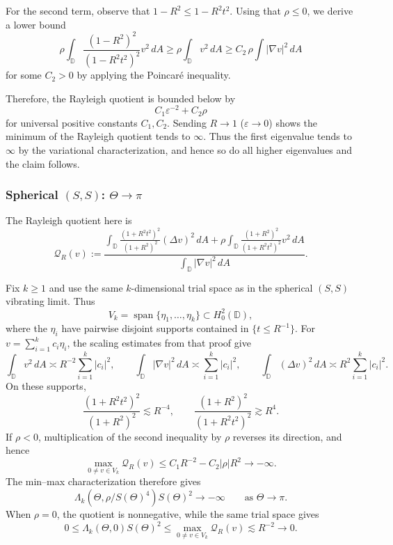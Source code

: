 \documentclass[11pt]{amsart}
\theoremstyle{definition}
\numberwithin{equation}{section}
\newcommand{\lapl}{\Delta}
\newcommand{\grad}{\nabla}
\newcommand{\D}{\mathbb{D}}
\begin{document}
For the second term, observe that $1-R^2 \leq 1-R^2t^2$. Using that $\rho \leq 0$, we derive a lower bound 
\[
\rho\int_\D \frac{(1-R^2)^2}{(1-R^2t^2)^2}v^2 \, dA \geq \rho\int_\D v^2 \, dA \geq C_2 \,\rho \int |\grad v|^2 \, dA
\]
for some $C_2 > 0$ by applying the Poincaré inequality.

Therefore, the Rayleigh quotient is bounded below by
\[
C_1 \varepsilon^{-2} + C_2\rho
\]
for universal positive constants $C_1, C_2$. Sending $R \to 1$ ($\varepsilon \to 0$) shows the minimum of the Rayleigh quotient tends to $\infty$. Thus the first eigenvalue tends to $\infty$ by the variational characterization, and hence so do all higher eigenvalues and the claim follows. 

\subsubsection*{Spherical $(S,S)$: $\Theta \to \pi$}

The Rayleigh quotient here is
\[
\mathcal Q_R(v):=
\dfrac{\displaystyle \int_{\D}\frac{(1+ R^2t^2)^2}{(1+ R^2)^2}(\lapl v)^2 \,  dA +\rho\int_{\D}\frac{(1+  R^2)^2}{(1+  R^2t^2)^2}v^2 \, dA}{\displaystyle \int_{\D} |\grad v|^2 \, dA}.
\]

Fix $k\geq1$ and use the same $k$-dimensional trial space as in the spherical $(S,S)$ vibrating limit. Thus
\[
V_k=\operatorname{span}\{\eta_1,\dots,\eta_k\}\subset H_0^2(\D),
\]
where the $\eta_i$ have pairwise disjoint supports contained in $\{t\leq R^{-1}\}$. For $v=\sum_{i=1}^k c_i\eta_i$, the scaling estimates from that proof give
\[
\int_\D v^2\,dA\asymp R^{-2}\sum_{i=1}^k|c_i|^2,\qquad
\int_\D|\grad v|^2\,dA\asymp\sum_{i=1}^k|c_i|^2,
\qquad
\int_\D(\lapl v)^2\,dA\asymp R^2\sum_{i=1}^k|c_i|^2.
\]
On these supports,
\[
\frac{(1+R^2t^2)^2}{(1+R^2)^2}\lesssim R^{-4},
\qquad
\frac{(1+R^2)^2}{(1+R^2t^2)^2}\gtrsim R^4.
\]
If $\rho<0$, multiplication of the second inequality by $\rho$ reverses its direction, and hence
\[
\max_{0\neq v\in V_k}\mathcal Q_R(v)
\leq C_1R^{-2}-C_2|\rho|R^2\longrightarrow-\infty.
\]
The min--max characterization therefore gives
\[
\Lambda_k(\Theta,\rho/S(\Theta)^4)S(\Theta)^2\longrightarrow-\infty
\qquad\text{as }\Theta\to\pi.
\]
When $\rho=0$, the quotient is nonnegative, while the same trial space gives
\[
0\leq \Lambda_k(\Theta,0)S(\Theta)^2
\leq \max_{0\neq v\in V_k}\mathcal Q_R(v)
\lesssim R^{-2}\longrightarrow0.
\]
\end{document}
